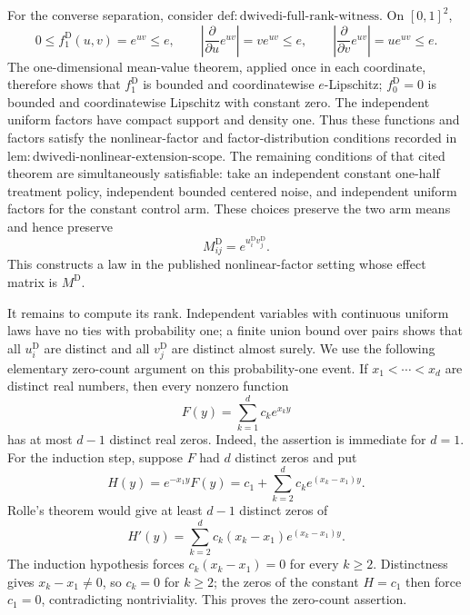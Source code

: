 For the converse separation, consider \(\mathrm{def:dwivedi\mbox{-}full\mbox{-}rank\mbox{-}witness}\).  On \([0,1]^2\),
\[
 0\le f^{\mathrm D}_1(u,v)=e^{uv}\le e,
 \qquad
 \left|\frac{\partial}{\partial u}e^{uv}\right|=ve^{uv}\le e,
 \qquad
 \left|\frac{\partial}{\partial v}e^{uv}\right|=ue^{uv}\le e.
\]
The one-dimensional mean-value theorem, applied once in each coordinate, therefore shows that \(f^{\mathrm D}_1\) is bounded and coordinatewise \(e\)-Lipschitz; \(f^{\mathrm D}_0=0\) is bounded and coordinatewise Lipschitz with constant zero.  The independent uniform factors have compact support and density one.  Thus these functions and factors satisfy the nonlinear-factor and factor-distribution conditions recorded in \(\mathrm{lem:dwivedi\mbox{-}nonlinear\mbox{-}extension\mbox{-}scope}\).  The remaining conditions of that cited theorem are simultaneously satisfiable: take an independent constant one-half treatment policy, independent bounded centered noise, and independent uniform factors for the constant control arm.  These choices preserve the two arm means and hence preserve
\[
 M^{\mathrm D}_{ij}=e^{u_i^{\mathrm D}v_j^{\mathrm D}}.
\]
This constructs a law in the published nonlinear-factor setting whose effect matrix is \(M^{\mathrm D}\).

It remains to compute its rank.  Independent variables with continuous uniform laws have no ties with probability one; a finite union bound over pairs shows that all \(u_i^{\mathrm D}\) are distinct and all \(v_j^{\mathrm D}\) are distinct almost surely.  We use the following elementary zero-count argument on this probability-one event.  If \(x_1<\cdots<x_d\) are distinct real numbers, then every nonzero function
\[
 F(y)=\sum_{k=1}^d c_k e^{x_k y}
\]
has at most \(d-1\) distinct real zeros.  Indeed, the assertion is immediate for \(d=1\).  For the induction step, suppose \(F\) had \(d\) distinct zeros and put
\[
 H(y)=e^{-x_1y}F(y)=c_1+\sum_{k=2}^d c_k e^{(x_k-x_1)y}.
\]
Rolle's theorem would give at least \(d-1\) distinct zeros of
\[
 H'(y)=\sum_{k=2}^d c_k(x_k-x_1)e^{(x_k-x_1)y}.
\]
The induction hypothesis forces \(c_k(x_k-x_1)=0\) for every \(k\ge2\).  Distinctness gives \(x_k-x_1\ne0\), so \(c_k=0\) for \(k\ge2\); the zeros of the constant \(H=c_1\) then force \(c_1=0\), contradicting nontriviality.  This proves the zero-count assertion.

